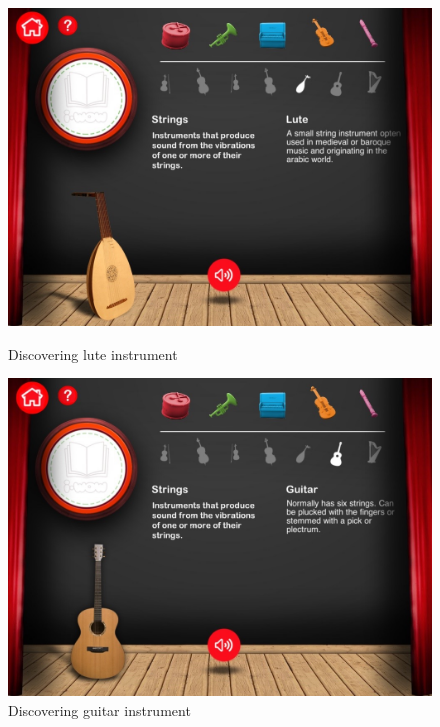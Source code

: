 \begin{figure}[ht!]
  \centering
  \includegraphics[width=350pt]{graphics/additional-screens/discovering_strings_lute_screen.jpg}
  \vspace{0.05cm}
  \caption{Discovering lute instrument}
  \vspace{0.6cm}

  \includegraphics[width=350pt]{graphics/additional-screens/discovering_strings_guitar_screen.jpg}
  \vspace{0.05cm}
  \caption{Discovering guitar instrument}
\end{figure}

